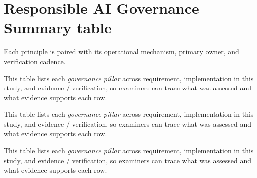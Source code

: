 \section{Responsible AI Governance Summary table}
\label{sec:appendix_ch3_s14}

\tablefontsize

\noindent Each principle is paired with its operational mechanism, primary owner, and verification cadence.

\noindent This table lists each \textit{governance pillar} across requirement, implementation in this study, and evidence / verification, so examiners can trace what was assessed and what evidence supports each row.



\noindent This table lists each \textit{governance pillar} across requirement, implementation in this study, and evidence / verification, so examiners can trace what was assessed and what evidence supports each row.


\noindent This table lists each \textit{governance pillar} across requirement, implementation in this study, and evidence / verification, so examiners can trace what was assessed and what evidence supports each row.



